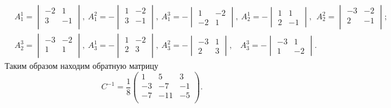 \begin{align*}
    &A_1^1 = \begin{vmatrix}
        -2 & 1 \\
        3 & -1 \\
    \end{vmatrix}, \  
    A_1^2 = - \begin{vmatrix}
        1 & -2 \\
        3 & -1 \\
    \end{vmatrix}, \  
    A_1^3 = - \begin{vmatrix}
        1 & -2 \\
        -2 & 1
    \end{vmatrix}, \  
    A_2^1 = - \begin{vmatrix}
        1 & 1 \\
        2 & -1
    \end{vmatrix}, \  \
    A_2^2 = \begin{vmatrix}
        -3 & -2 \\
        2 & -1 \\
    \end{vmatrix}; 
    \\
    &A_2^3 = \begin{vmatrix}
        -3 & -2 \\
        1 & 1 \\
    \end{vmatrix}, \  
    A_3^1 = - \begin{vmatrix}
        1 & -2 \\
        2 & 3 \\
    \end{vmatrix}, \  
    A_3^2 = - \begin{vmatrix}
        -3 & 1 \\
        2 & 3
    \end{vmatrix}, \  
    \ \; \, A_3^3 = - \begin{vmatrix}
        -3 & 1 \\
        1 & -2
    \end{vmatrix}.
\end{align*}
Таким образом находим обратную матрицу
\begin{equation*}
    C^{-1} = \frac{1}{8} \begin{pmatrix}
        1 & 5 & 3 \\
        -3 & -7 & -1 \\
        -7 & -11 & -5 \\
    \end{pmatrix}.
\end{equation*}
